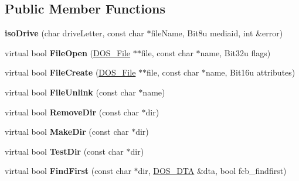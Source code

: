 \subsection*{Public Member Functions}
\begin{DoxyCompactItemize}
\item 
\hypertarget{classisoDrive_acef0969a0badc82beb041086ce3a6911}{{\bfseries iso\-Drive} (char drive\-Letter, const char $\ast$file\-Name, Bit8u mediaid, int \&error)}\label{classisoDrive_acef0969a0badc82beb041086ce3a6911}

\item 
\hypertarget{classisoDrive_adee4a9f8024d338c0edb2273e9847d15}{virtual bool {\bfseries File\-Open} (\hyperlink{classDOS__File}{D\-O\-S\-\_\-\-File} $\ast$$\ast$file, const char $\ast$name, Bit32u flags)}\label{classisoDrive_adee4a9f8024d338c0edb2273e9847d15}

\item 
\hypertarget{classisoDrive_ae5ffb49ab032de84f6b76b56caac59f6}{virtual bool {\bfseries File\-Create} (\hyperlink{classDOS__File}{D\-O\-S\-\_\-\-File} $\ast$$\ast$file, const char $\ast$name, Bit16u attributes)}\label{classisoDrive_ae5ffb49ab032de84f6b76b56caac59f6}

\item 
\hypertarget{classisoDrive_aa97512db7a6a47362a274bfe1fb3e04b}{virtual bool {\bfseries File\-Unlink} (const char $\ast$name)}\label{classisoDrive_aa97512db7a6a47362a274bfe1fb3e04b}

\item 
\hypertarget{classisoDrive_a2e45d1a03e04d47ffc06af59cad20075}{virtual bool {\bfseries Remove\-Dir} (const char $\ast$dir)}\label{classisoDrive_a2e45d1a03e04d47ffc06af59cad20075}

\item 
\hypertarget{classisoDrive_a65564ef88771889a90341d50185b3b63}{virtual bool {\bfseries Make\-Dir} (const char $\ast$dir)}\label{classisoDrive_a65564ef88771889a90341d50185b3b63}

\item 
\hypertarget{classisoDrive_a7eaff803896a019a60e3956ffdf4ccf7}{virtual bool {\bfseries Test\-Dir} (const char $\ast$dir)}\label{classisoDrive_a7eaff803896a019a60e3956ffdf4ccf7}

\item 
\hypertarget{classisoDrive_a674f137dfdde43389226c217019017d6}{virtual bool {\bfseries Find\-First} (const char $\ast$dir, \hyperlink{classDOS__DTA}{D\-O\-S\-\_\-\-D\-T\-A} \&dta, bool fcb\-\_\-findfirst)}\label{classisoDrive_a674f137dfdde43389226c217019017d6}


\end{DoxyCompactItemize}
